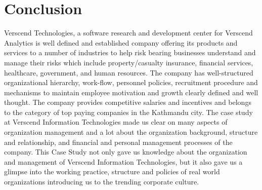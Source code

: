 \section{Conclusion}
Verscend Technologies, a software research and development center for Verscend Analytics is well
defined and established company offering its products and services to a number of industries to help risk
bearing businesses understand and manage their risks which include property/casualty insurance, financial
services, healthcare, government, and human resources. The company has well-structured organizational
hierarchy, work-flow, personnel policies, recruitment procedure and mechanisms to maintain employee
motivation and growth clearly defined and well thought. The company provides competitive salaries and
incentives and belongs to the category of top paying companies in the Kathmandu city.
The case study at Verscend Information Technologies made us clear on many aspects of organization
management and a lot about the organization background, structure and relationship, and financial and
personal management processes of the company.
This Case Study not only gave us knowledge about the organization and management of Verscend Information
Technologies, but it also gave us a glimpse into the working practice, structure and policies of real world
organizations introducing us to the trending corporate culture.
\cleardoublepage
